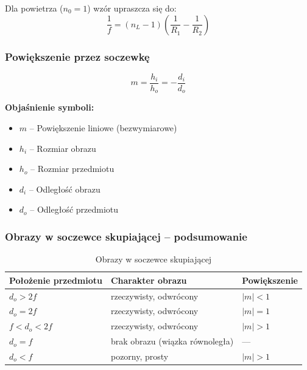 \documentclass[12pt,a4paper]{article}
\newcommand{\oznaczenie}[2]{%
  \item $#1$ -- #2%
}
\begin{document}
Dla powietrza ($n_0=1$) wzór upraszcza się do:
\begin{equation}
  \frac{1}{f} = (n_L - 1)\left(\frac{1}{R_1} - \frac{1}{R_2}\right)
\end{equation}

\subsubsection{Powiększenie przez soczewkę}

\begin{wzorbox}
\begin{equation}
  m = \frac{h_i}{h_o} = -\frac{d_i}{d_o}
  \label{eq:powiekszenie_soczewka}
\end{equation}
\end{wzorbox}

\begin{objasnbox}
\textbf{Objaśnienie symboli:}
\begin{itemize}[leftmargin=2em]
  \oznaczenie{m}{Powiększenie liniowe (bezwymiarowe)}
  \oznaczenie{h_i}{Rozmiar obrazu \quad [\textbf{m}]}
  \oznaczenie{h_o}{Rozmiar przedmiotu \quad [\textbf{m}]}
  \oznaczenie{d_i}{Odległość obrazu \quad [\textbf{m}]}
  \oznaczenie{d_o}{Odległość przedmiotu \quad [\textbf{m}]}
\end{itemize}
\end{objasnbox}

\subsubsection{Obrazy w soczewce skupiającej -- podsumowanie}

\begin{table}[H]
\centering
\renewcommand{\arraystretch}{1.4}
\begin{tabular}{lll}
\toprule
\textbf{Położenie przedmiotu} & \textbf{Charakter obrazu} & \textbf{Powiększenie} \\
\midrule
$d_o > 2f$        & rzeczywisty, odwrócony & $|m|<1$ \\
$d_o = 2f$        & rzeczywisty, odwrócony & $|m|=1$ \\
$f < d_o < 2f$    & rzeczywisty, odwrócony & $|m|>1$ \\
$d_o = f$         & brak obrazu (wiązka równoległa) & --- \\
$d_o < f$         & pozorny, prosty       & $|m|>1$ \\
\bottomrule
\end{tabular}
\caption{Obrazy w soczewce skupiającej}
\end{table}
\end{document}
